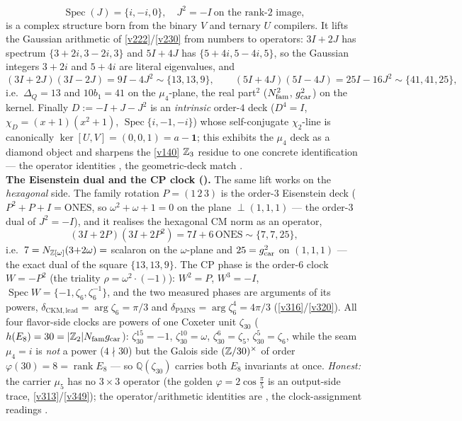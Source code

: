 \begin{keybox}
\[  \operatorname{Spec}(J)=\{i,-i,0\},\quad J^2=-I\ \text{on the rank-2 image},
\]
is a complex structure born from the binary $V$ and ternary $U$ compilers. It lifts the Gaussian
arithmetic of \vref{v222}/\vref{v230} from numbers to operators: $3I{+}2J$ has spectrum
$\{3{+}2i,3{-}2i,3\}$ and $5I{+}4J$ has $\{5{+}4i,5{-}4i,5\}$, so the Gaussian integers $3{+}2i$ and
$5{+}4i$ are literal eigenvalues, and
\[
  (3I{+}2J)(3I{-}2J)=9I-4J^2\sim\{13,13,9\},\qquad (5I{+}4J)(5I{-}4J)=25I-16J^2\sim\{41,41,25\},
\]
i.e.\ $\Delta_Q=13$ and $10b_1=41$ on the $\mu_4$-plane, the real part$^2$ ($N_{\mathrm{fam}}^2$, $g_{\mathrm{car}}^2$) on the
kernel. Finally $D:=-I+J-J^2$ is an \emph{intrinsic} order-$4$ deck ($D^4=I$, $\chi_D=(x{+}1)(x^2{+}1)$,
$\operatorname{Spec}\{i,-1,-i\}$) whose self-conjugate $\chi_2$-line is canonically
$\ker[U,V]=(0,0,1)=a-\mathbf 1$; this exhibits the $\mu_4$ deck as a diamond object and sharpens the
\vref{v140} $\mathbb{Z}_3$ residue to one concrete identification --- the operator identities \mE, the
geometric-deck match \mC.
\smallskip\\
\noindent\textbf{The Eisenstein dual and the CP clock ().}
The same lift works on the \emph{hexagonal} side. The family rotation $P=(1\,2\,3)$ is the order-$3$
Eisenstein deck ($P^2+P+I=\mathrm{ONES}$, so $\omega^2+\omega+1=0$ on the plane $\perp(1,1,1)$ --- the
order-$3$ dual of $J^2=-I$), and it realises the hexagonal CM norm as an operator,
\[
  (3I+2P)(3I+2P^2)=7I+6\,\mathrm{ONES}\sim\{7,7,25\},
\]
i.e.\ $7=N_{\mathbb{Z}[\omega]}(3{+}2\omega)=$ scalaron on the $\omega$-plane and $25=g_{\mathrm{car}}^2$ on $(1,1,1)$ ---
the exact dual of the square $\{13,13,9\}$. The CP phase is the order-$6$ clock $W=-P^2$ (the triality
$\rho=\omega^2{\cdot}({-}1)$): $W^2=P$, $W^3=-I$, $\operatorname{Spec}W=\{-1,\zeta_6,\zeta_6^{-1}\}$, and the
two measured phases are arguments of its powers, $\delta_{\mathrm{CKM,lead}}=\arg\zeta_6=\pi/3$ and
$\delta_{\mathrm{PMNS}}=\arg\zeta_6^4=4\pi/3$ (\vref{v316}/\vref{v320}). All four flavor-side clocks are
powers of one Coxeter unit $\zeta_{30}$ ($h(E_8)=30=|\mathbb{Z}_2|N_{\mathrm{fam}}g_{\mathrm{car}}$): $\zeta_{30}^{15}=-1$,
$\zeta_{30}^{10}=\omega$, $\zeta_{30}^{6}=\zeta_5$, $\zeta_{30}^{5}=\zeta_6$, while the seam $\mu_4=i$ is
\emph{not} a power ($4\nmid30$) but the Galois side $(\mathbb{Z}/30)^\times$ of order
$\varphi(30)=8=\operatorname{rank}E_8$ --- so $\mathbb Q(\zeta_{30})$ carries both $E_8$ invariants at
once. \emph{Honest:} the carrier $\mu_5$ has no $3{\times}3$ operator (the golden $\varphi=2\cos\tfrac\pi5$
is an output-side trace, \vref{v313}/\vref{v349}); the operator/arithmetic identities are \mE, the
clock-assignment readings \mC.
\end{keybox}

